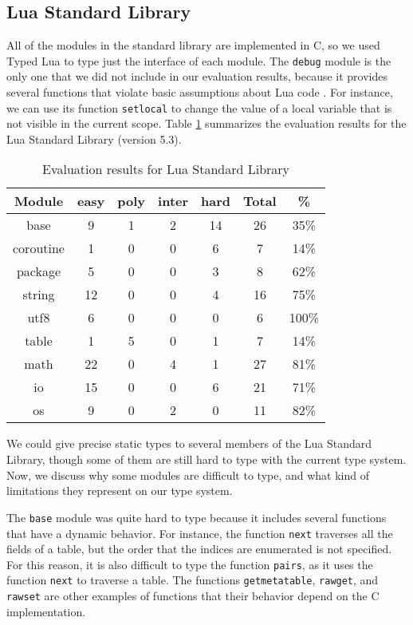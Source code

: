 \subsection{Lua Standard Library}

All of the modules in the standard library are implemented in C, so
we used Typed Lua to type just the interface of each module.
The \texttt{debug} module is the only one that we did not include in our
evaluation results, because it provides several functions that violate
basic assumptions about Lua code \citep{luamanual}.
For instance, we can use its function \texttt{setlocal} to change the value
of a local variable that is not visible in the current scope.
Table \ref{tab:evallsl} summarizes the evaluation results for the Lua Standard Library
(version 5.3).

\begin{table}[!ht]
\begin{center}
\begin{tabular}{|c|c|c|c|c|c|c|}
\hline
\textbf{Module} & \textbf{easy} & \textbf{poly} & \textbf{inter} & \textbf{hard} & \textbf{Total} & \textbf{\%} \\
\hline
base & 9 & 1 & 2 & 14 & 26 & 35\% \\
\hline
coroutine & 1 & 0 & 0 & 6 & 7 & 14\% \\
\hline
package & 5 & 0 & 0 & 3 & 8 & 62\% \\
\hline
string & 12 & 0 & 0 & 4 & 16 & 75\% \\
\hline
utf8 & 6 & 0 & 0 & 0 & 6 & 100\% \\
\hline
table & 1 & 5 & 0 & 1 & 7 & 14\% \\
\hline
math & 22 & 0 & 4 & 1 & 27 & 81\% \\
\hline
io & 15 & 0 & 0 & 6 & 21 & 71\% \\
\hline
os & 9 & 0 & 2 & 0 & 11 & 82\% \\
\hline
\end{tabular}
\end{center}
\caption{Evaluation results for Lua Standard Library}
\label{tab:evallsl}
\end{table}

We could give precise static types to several members of
the Lua Standard Library, though some of them are still
hard to type with the current type system.
Now, we discuss why some modules are difficult to type,
and what kind of limitations they represent on our type system.

The \texttt{base} module was quite hard to type because it
includes several functions that have a dynamic behavior.
For instance, the function \texttt{next} traverses all the
fields of a table, but the order that the indices are
enumerated is not specified.
For this reason, it is also difficult to type the function
\texttt{pairs}, as it uses the function \texttt{next} to
traverse a table.
The functions \texttt{getmetatable}, \texttt{rawget}, and
\texttt{rawset} are other examples of functions that their
behavior depend on the C implementation.

